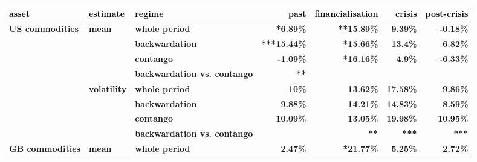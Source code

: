\documentclass[
  authoryear,
  preprint,
  3p]{elsarticle}
\begin{document}
\begin{longtable}[t]{>{}l>{}l>{}l>{}r>{}r>{}r>{}r}
\toprule
\textcolor{black}{\textbf{asset}} & \textcolor{black}{\textbf{estimate}} & \textcolor{black}{\textbf{regime}} & \textcolor{black}{\textbf{past}} & \textcolor{black}{\textbf{financialisation}} & \textcolor{black}{\textbf{crisis}} & \textcolor{black}{\textbf{post-crisis}}\\
\midrule
\textbf{US commodities} & \textbf{mean} & \textbf{whole period} & \textcolor[HTML]{4285f4}{\textbf{*6.89\%}} & \textcolor[HTML]{4285f4}{\textbf{**15.89\%}} & \textcolor[HTML]{4285f4}{\textbf{9.39\%}} & \textcolor[HTML]{4285f4}{\textbf{-0.18\%}}\\
\textbf{} & \textbf{} & \textbf{backwardation} & \textcolor[HTML]{4285f4}{\textbf{***15.44\%}} & \textcolor[HTML]{4285f4}{\textbf{*15.66\%}} & \textcolor[HTML]{4285f4}{\textbf{13.4\%}} & \textcolor[HTML]{4285f4}{\textbf{6.82\%}}\\
\textbf{} & \textbf{} & \textbf{contango} & \textcolor[HTML]{4285f4}{\textbf{-1.09\%}} & \textcolor[HTML]{4285f4}{\textbf{*16.16\%}} & \textcolor[HTML]{4285f4}{\textbf{4.9\%}} & \textcolor[HTML]{4285f4}{\textbf{-6.33\%}}\\
\textbf{} & \textbf{} & \textbf{backwardation vs. contango} & \textcolor[HTML]{4285f4}{\textbf{**}} & \textcolor[HTML]{4285f4}{\textbf{}} & \textcolor[HTML]{4285f4}{\textbf{}} & \textcolor[HTML]{4285f4}{\textbf{}}\\
\textbf{} & \textbf{volatility} & \textbf{whole period} & \textcolor[HTML]{4285f4}{\textbf{10\%}} & \textcolor[HTML]{4285f4}{\textbf{13.62\%}} & \textcolor[HTML]{4285f4}{\textbf{17.58\%}} & \textcolor[HTML]{4285f4}{\textbf{9.86\%}}\\
\addlinespace
\textbf{} & \textbf{} & \textbf{backwardation} & \textcolor[HTML]{4285f4}{\textbf{9.88\%}} & \textcolor[HTML]{4285f4}{\textbf{14.21\%}} & \textcolor[HTML]{4285f4}{\textbf{14.83\%}} & \textcolor[HTML]{4285f4}{\textbf{8.59\%}}\\
\textbf{} & \textbf{} & \textbf{contango} & \textcolor[HTML]{4285f4}{\textbf{10.09\%}} & \textcolor[HTML]{4285f4}{\textbf{13.05\%}} & \textcolor[HTML]{4285f4}{\textbf{19.98\%}} & \textcolor[HTML]{4285f4}{\textbf{10.95\%}}\\
\textbf{} & \textbf{} & \textbf{backwardation vs. contango} & \textcolor[HTML]{4285f4}{\textbf{}} & \textcolor[HTML]{4285f4}{\textbf{**}} & \textcolor[HTML]{4285f4}{\textbf{***}} & \textcolor[HTML]{4285f4}{\textbf{***}}\\
\textbf{GB commodities} & \textbf{mean} & \textbf{whole period} & \textcolor[HTML]{4285f4}{\textbf{2.47\%}} & \textcolor[HTML]{4285f4}{\textbf{*21.77\%}} & \textcolor[HTML]{4285f4}{\textbf{5.25\%}} & \textcolor[HTML]{4285f4}{\textbf{2.72\%}}\\

\end{longtable}
\end{document}
